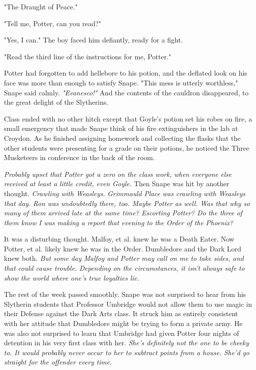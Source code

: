 "The Draught of Peace."

"Tell me, Potter, can you read?"

"Yes, I can." The boy faced him defiantly, ready for a fight.

"Read the third line of the instructions for me, Potter."

Potter had forgotten to add hellebore to his potion, and the deflated look on his face was more than enough to satisfy Snape. "This mess is utterly worthless," Snape said calmly. \emph{"Evanesco!"} And the contents of the cauldron disappeared, to the great delight of the Slytherins.

Class ended with no other hitch except that Goyle's potion set his robes on fire, a small emergency that made Snape think of his fire extinguishers in the lab at Croydon. As he finished assigning homework and collecting the flasks that the other students were presenting for a grade on their potions, he noticed the Three Musketeers in conference in the back of the room.

\emph{Probably upset that Potter got a zero on the class work, when everyone else received at least a little credit, even Goyle.} Then Snape was hit by another thought. \emph{Crawling with Weasleys. Grimmauld Place was crawling with Weasleys that day. Ron was undoubtedly there, too. Maybe Potter as well. Was that why so many of them arrived late at the same time? Escorting Potter? Do the three of them know I was making a report that evening to the Order of the Phoenix?}

It was a disturbing thought. Malfoy, et al. knew he was a Death Eater. Now Potter, et al. likely knew he was in the Order. Dumbledore and the Dark Lord knew both. \emph{But some day Malfoy and Potter may call on me to take sides, and that could cause trouble. Depending on the circumstances, it isn't always safe to show the world where one's true loyalties lie.}

The rest of the week passed smoothly. Snape was not surprised to hear from his Slytherin students that Professor Umbridge would not allow them to use magic in their Defense against the Dark Arts class. It struck him as entirely consistent with her attitude that Dumbledore might be trying to form a private army. He was also not surprised to learn that Umbridge had given Potter four nights of detention in his very first class with her. \emph{She's definitely not the one to be cheeky to. It would probably never occur to her to subtract points from a house. She'd go straight for the offender every time.}

